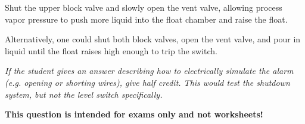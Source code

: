 
Shut the upper block valve and slowly open the vent valve, allowing process vapor pressure to push more liquid into the float chamber and raise the float.

\vskip 10pt

Alternatively, one could shut both block valves, open the vent valve, and pour in liquid until the float raises high enough to trip the switch.

\vskip 10pt

{\it If the student gives an answer describing how to electrically simulate the alarm (e.g. opening or shorting wires), give half credit.  This would test the shutdown system, but not the level switch specifically.}







{\bf This question is intended for exams only and not worksheets!}




